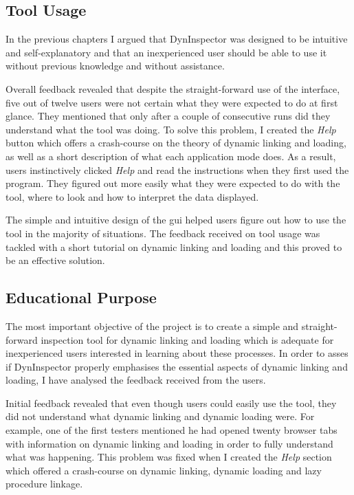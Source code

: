 \subsection{Tool Usage}

In the previous chapters I argued that DynInspector was designed to be intuitive and self-explanatory and that an inexperienced user should be able to use it without previous knowledge and without assistance.

Overall feedback revealed that despite the straight-forward use of the interface, five out of twelve users were not certain what they were expected to do at first glance. They mentioned that only after a couple of consecutive runs did they understand what the tool was doing. To solve this problem, I created the \textit{Help} button which offers a crash-course on the theory of dynamic linking and loading, as well as a short description of what each application mode does. As a result, users instinctively clicked \textit{Help} and read the instructions when they first used the program. They figured out more easily what they were expected to do with the tool, where to look and how to interpret the data displayed.

The simple and intuitive design of the gui helped users figure out how to use the tool in the majority of situations. The feedback received on tool usage was tackled with a short tutorial on dynamic linking and loading and this proved to be an effective solution.

\subsection{Educational Purpose}

The most important objective of the project is to create a simple and straight-forward inspection tool for dynamic linking and loading which is adequate for inexperienced users interested in learning about these processes. In order to asses if DynInspector properly emphasises the essential aspects of dynamic linking and loading, I have analysed the feedback received from the users.

Initial feedback revealed that even though users could easily use the tool, they did not understand what dynamic linking and dynamic loading were. For example, one of the first testers mentioned he had opened twenty browser tabs with information on dynamic linking and loading in order to fully understand what was happening. This problem was fixed when I created the \textit{Help} section which offered a crash-course on dynamic linking, dynamic loading and lazy procedure linkage.

